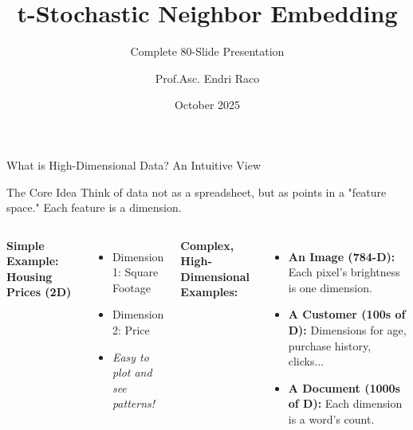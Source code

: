 \documentclass[aspectratio=169]{beamer}
\title{t-Stochastic Neighbor Embedding}
\subtitle{Complete 80-Slide Presentation}
\author{Prof.Asc. Endri Raco}
\institute{Polytechnic University of Tirane}
\date{October 2025}
\begin{document}

\begin{frame}
\titlepage
\end{frame}

\begin{frame}{What is High-Dimensional Data? An Intuitive View}
    \begin{block}{The Core Idea}
        Think of data not as a spreadsheet, but as points in a "feature space." Each feature is a dimension.
    \end{block}

    \begin{columns}[T]
            \textbf{Simple Example: Housing Prices (2D)}
            \begin{itemize}\small
                \item Dimension 1: Square Footage
                \item Dimension 2: Price
                \item \textit{Easy to plot and see patterns!}
            \end{itemize}

            \vspace{0.4cm} %
            \textbf{Complex, High-Dimensional Examples:}
            \begin{itemize}\small
                \item \textbf{An Image (784-D):} Each pixel's brightness is one dimension.
                \item \textbf{A Customer (100s of D):} Dimensions for age, purchase history, clicks...
                \item \textbf{A Document (1000s of D):} Each dimension is a word's count.
            \end{itemize}


\end{columns}
\end{frame}
\end{document}

